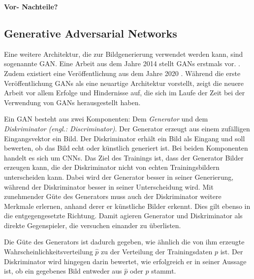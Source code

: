 \textbf{Vor- Nachteile?}

\label{chap:GANs}
\subsection{Generative Adversarial Networks}
Eine weitere Architektur, die zur Bildgenerierung verwendet werden kann, sind sogenannte \acs{GAN}. Eine Arbeit aus dem Jahre 2014 stellt \acp{GAN} erstmals vor. \cite{Goodfellow-GANs}. Zudem existiert eine Veröffentlichung aus dem Jahre 2020 \cite{GANs}. Während die erste Veröffentlichung \acp{GAN} als eine neuartige Architektur vorstellt, zeigt die neuere Arbeit vor allem Erfolge und Hindernisse auf, die sich im Laufe der Zeit bei der Verwendung von \acp{GAN} herausgestellt haben.

Ein \ac{GAN} besteht aus zwei Komponenten: Dem \emph{Generator} und dem \emph{Diskriminator} \emph{(engl.: Discriminator)}. Der Generator erzeugt aus einem zufälligen Eingangsvektor ein Bild. Der Diskriminator erhält ein Bild als Eingang und soll bewerten, ob das Bild echt oder künstlich generiert ist. Bei beiden Komponenten handelt es sich um \acp{CNN}. Das Ziel des Trainings ist, dass der Generator Bilder erzeugen kann, die der Diskriminator nicht von echten Trainingsbildern unterscheiden kann. Dabei wird der Generator besser in seiner Generierung, während der Diskriminator besser in seiner Unterscheidung wird. Mit zunehmender Güte des Generators muss auch der Diskriminator weitere Merkmale erlernen, anhand derer er künstliche Bilder erkennt. Dies gilt ebenso in die entgegengesetzte Richtung. Damit agieren Generator und Diskriminator als direkte Gegenspieler, die versuchen einander zu überlisten. \cite{GANs}

Die Güte des Generators ist dadurch gegeben, wie ähnlich die von ihm erzeugte Wahrscheinlichkeitsverteilung $\hat{p}$ zu der Verteilung der Trainingsdaten $p$ ist. Der Diskriminator wird hingegen darin bewertet, wie erfolgreich er in seiner Aussage ist, ob ein gegebenes Bild entweder aus $\hat{p}$ oder $p$ stammt. \cite{GANs}

